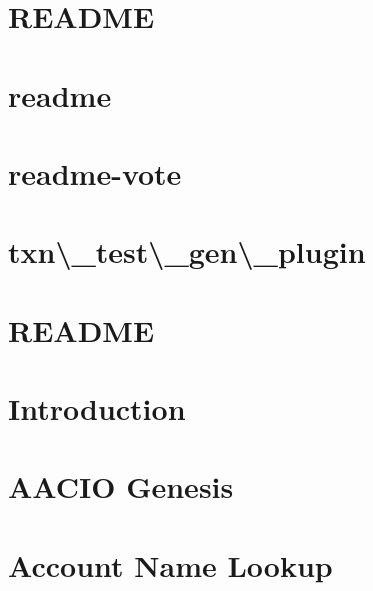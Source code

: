 \documentclass[twoside]{book}
\newcommand{\+}{\discretionary{\mbox{\scriptsize$\hookleftarrow$}}{}{}}
\begin{document}
\chapter{R\+E\+A\+D\+ME}
\label{md_libraries_wasm-jit__r_e_a_d_m_e}

\chapter{readme}
\label{md_myscripts_aac-test-py_readme}

\chapter{readme-\/vote}
\label{md_myscripts_vote-test-scripts_readme-vote}

\chapter{txn\textbackslash{}\+\_\+test\textbackslash{}\+\_\+gen\textbackslash{}\+\_\+plugin}
\label{md_plugins_txn_test_gen_plugin__r_e_a_d_m_e}

\chapter{R\+E\+A\+D\+ME}
\label{md_programs_aacio-applesedemo__r_e_a_d_m_e}

\chapter{Introduction}
\label{md_programs_debug_node__r_e_a_d_m_e}

\chapter{A\+A\+C\+IO Genesis}
\label{md_programs_snapshot_readme}

\chapter{Account Name Lookup}
\label{md_programs_snapshot_tools_account-name_readme}

\end{document}
